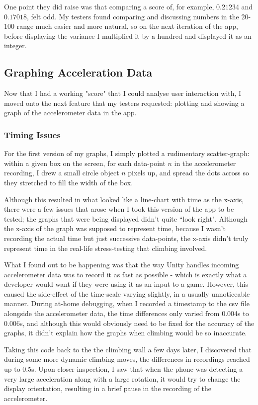 One point they did raise was that comparing a score of, for example, $0.21234$ and $0.17018$, felt odd.
My testers found comparing and discussing numbers in the 20-100 range much easier and more natural, so on the next iteration of the app, before displaying the variance I multiplied it by a hundred and displayed it as an integer.

\subsection{Graphing Acceleration Data}
Now that I had a working "score" that I could analyse user interaction with, I moved onto the next feature that my testers requested: plotting and showing a graph of the accelerometer data in the app.

\subsubsection{Timing Issues}
For the first version of my graphs, I simply plotted a rudimentary scatter-graph:
within a given box on the screen, for each data-point $n$ in the accelerometer recording, I drew a small circle object $n$ pixels up, and spread the dots across so they stretched to fill the width of the box.

Although this resulted in what looked like a line-chart with time as the x-axis, there were a few issues that arose when I took this version of the app to be tested;
the graphs that were being displayed didn't quite ``look right".
Although the x-axis of the graph was supposed to represent time, because I wasn't recording the actual time but just successive data-points, the x-axis didn't truly represent time in the real-life stress-testing that climbing involved.

What I found out to be happening was that the way Unity handles incoming accelerometer data was to record it as fast as possible - which is exactly what a developer would want if they were using it as an input to a game.
However, this caused the side-effect of the time-scale varying slightly, in a usually unnoticeable manner.
During at-home debugging, when I recorded a timestamp to the csv file alongside the accelerometer data, the time differences only varied from 0.004s to 0.006s, and although this would obviously need to be fixed for the accuracy of the graphs, it didn't explain how the graphs when climbing would be so inaccurate.

Taking this code back to the the climbing wall a few days later, I discovered that during some more dynamic climbing moves, the differences in recordings reached up to 0.5s.
Upon closer inspection, I saw that when the phone was detecting a very large acceleration along with a large rotation, it would try to change the display orientation, resulting in a brief pause in the recording of the accelerometer.

